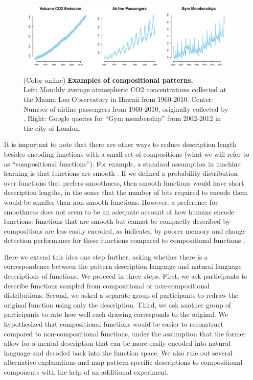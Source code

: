\documentclass[a4paper,man, floatsintext, natbib]{apa6}
\begin{document}
\begin{figure}[h] 
\centerline{\includegraphics[width=\textwidth]{compdata.pdf}}
\caption{(Color online) \textbf{Examples of compositional patterns.} \\
 Left: Monthly average atmospheric CO2 concentrations collected at the Mauna Loa Observatory in Hawaii from 1960-2010. Center: Number of airline passengers from 1960-2010, originally collected by \cite{box2015time}. Right: Google queries for ``Gym membership'' from 2002-2012 in the city of London.
}
\label{fig:compexample}
\end{figure}

It is important to note that there are other ways to reduce description length besides encoding functions with a small set of compositions (what we will refer to as ``compositional functions''). For example, a standard assumption in machine learning is that functions are smooth \citep{rasmussen2006gaussian}. If we defined a probability distribution over functions that prefers smoothness, then smooth functions would have short description lengths, in the sense that the number of bits required to encode them would be smaller than non-smooth functions. However, a preference for smoothness does not seem to be an adequate account of how humans encode functions: functions that are smooth but cannot be compactly described by compositions are less easily encoded, as indicated by poorer memory and change detection performance for these functions compared to compositional functions \citep[][see also additional analysis in the Supporting Information]{schulz2017compositional}.

Here we extend this idea one step further, asking whether there is a correspondence between the pattern description language and natural language descriptions of functions. We proceed in three steps. First, we ask participants to describe functions sampled from compositional or non-compositional distributions. Second, we asked a separate group of participants to redraw the original function using only the description. Third, we ask another group of participants to rate how well each drawing corresponds to the original. We hypothesized that compositional functions would be easier to reconstruct compared to non-compositional functions, under the assumption that the former allow for a mental description that can be more easily encoded into natural language and decoded back into the function space. We also rule out several alternative explanations and map pattern-specific descriptions to compositional components with the help of an additional experiment.
\end{document}

